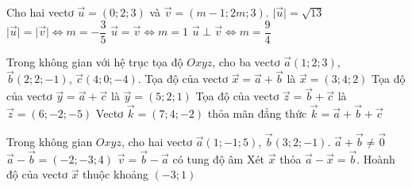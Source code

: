 \begin{ex}
	Cho hai vectơ $\vec{u}=(0;2;3)$ và $\vec{v}=(m-1;2m;3)$.
	\choiceTF
	{\True $\big|\vec{u}\big|=\sqrt{13}$}
	{$\big|\vec{u}\big|=\big|\vec{v}\big| \Leftrightarrow m=-\dfrac{3}{5}$}
	{\True $\vec{u}=\vec{v} \Leftrightarrow m=1$}
	{$\vec{u}\perp\vec{v} \Leftrightarrow m=\dfrac{9}{4}$}
\end{ex} 
\begin{ex}
	Trong không gian với hệ trục tọa độ $Oxyz$, cho ba vectơ $\vec{a}(1;2;3)$, $\vec{b}(2;2;-1)$, $\vec{c}(4;0;-4)$.
	\choiceTF
	{\True Tọa độ của vectơ $\vec{x}=\vec{a}+\vec{b}$ là $\vec{x}=(3;4;2)$}
	{Tọa độ của vectơ $\vec{y}=\vec{a}+\vec{c}$ là $\vec{y}=(5;2;1)$}
	{Tọa độ của vectơ $\vec{z}=\vec{b}+\vec{c}$ là $\vec{z}=(6;-2;-5)$}
	{\True Vectơ $\vec{k}=(7;4;-2)$ thỏa mãn đẳng thức $\vec{k}=\vec{a}+\vec{b}+\vec{c}$}
\end{ex}
\begin{ex}
	Trong không gian $Oxyz$, cho hai vectơ $\vec{a}(1;-1;5)$, $\vec{b}(3;2;-1)$.
	\choiceTF
	{\True $\vec{a}+\vec{b}\ne \vec{0}$}
	{$\vec{a}-\vec{b}=(-2;-3;4)$}
	{$\vec{v}=\vec{b}-\vec{a}$ có tung độ âm}
	{\True Xét $\vec{x}$ thỏa $\vec{a}-\vec{x}=\vec{b}$. Hoành độ của vectơ $\vec{x}$ thuộc khoảng $(-3;1)$}
\end{ex}
